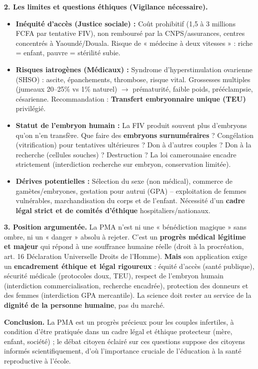 \documentclass[11pt]{article}
\begin{document}
\begin{exoresolu}
\textbf{2. Les limites et questions éthiques (Vigilance nécessaire).}
\begin{itemize}
\item \textbf{Inéquité d'accès (Justice sociale) :} Coût prohibitif (1,5 à 3 millions FCFA par tentative FIV), non remboursé par la CNPS/assurances, centres concentrés à Yaoundé/Douala. Risque de « médecine à deux vitesses » : riche = enfant, pauvre = stérilité subie.
\item \textbf{Risques iatrogènes (Médicaux) :} Syndrome d'hyperstimulation ovarienne (SHSO) : ascite, épanchements, thrombose, risque vital. Grossesses multiples (jumeaux 20--25\% vs 1\% naturel) $\rightarrow$ prématurité, faible poids, prééclampsie, césarienne. Recommandation : \textbf{Transfert embryonnaire unique (TEU)} privilégié.
\item \textbf{Statut de l'embryon humain :} La FIV produit souvent plus d'embryons qu'on n'en transfère. Que faire des \textbf{embryons surnuméraires} ? Congélation (vitrification) pour tentatives ultérieures ? Don à d'autres couples ? Don à la recherche (cellules souches) ? Destruction ? La loi camerounaise encadre strictement (interdiction recherche sur embryon, conservation limitée).
\item \textbf{Dérives potentielles :} Sélection du sexe (non médical), commerce de gamètes/embryones, gestation pour autrui (GPA) -- exploitation de femmes vulnérables, marchandisation du corps et de l'enfant. Nécessité d'un \textbf{cadre légal strict et de comités d'éthique} hospitaliers/nationaux.
\end{itemize}

\textbf{3. Position argumentée.} La PMA n'est ni une « bénédiction magique » sans ombre, ni un « danger » absolu à rejeter. C'est un \textbf{progrès médical légitime et majeur} qui répond à une souffrance humaine réelle (droit à la procréation, art. 16 Déclaration Universelle Droits de l'Homme). \textbf{Mais} son application exige un \textbf{encadrement éthique et légal rigoureux} : équité d'accès (santé publique), sécurité médicale (protocoles doux, TEU), respect de l'embryon humain (interdiction commercialisation, recherche encadrée), protection des donneurs et des femmes (interdiction GPA mercantile). La science doit rester au service de la \textbf{dignité de la personne humaine}, pas du marché.

\textbf{Conclusion.} La PMA est un progrès précieux pour les couples infertiles, à condition d'être pratiquée dans un cadre légal et éthique protecteur (mère, enfant, société) ; le débat citoyen éclairé sur ces questions suppose des citoyens informés scientifiquement, d'où l'importance cruciale de l'éducation à la santé reproductive à l'école.
\end{exoresolu}
\end{document}
